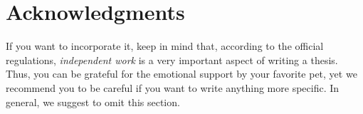 \chapter*{Acknowledgments}

If you want to incorporate it, keep in mind that, according to the official regulations, \emph{independent work} is a very important aspect of writing a thesis. 
Thus, you can be grateful for the emotional support by your favorite pet, yet we recommend you to be careful if you want to write anything more specific.
In general, we suggest to omit this section. 
